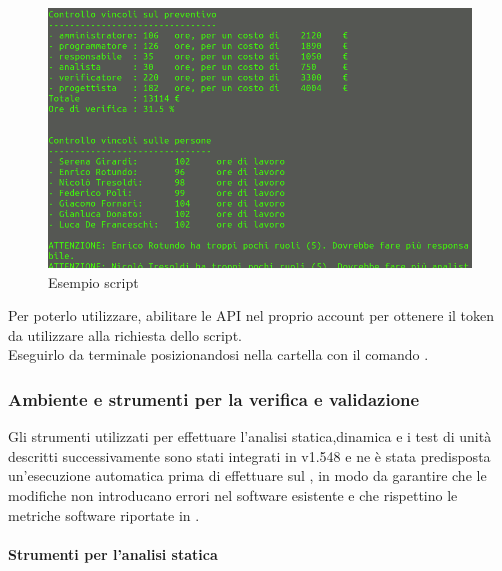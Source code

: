 \begin{figure}[H]
    \centering
    \includegraphics[scale=0.35] {ScriptGantt.png} 
    \caption{Esempio script}
\end{figure}

Per poterlo utilizzare, abilitare le API nel proprio account  per ottenere il token da utilizzare alla richiesta dello script. \\
Eseguirlo da terminale posizionandosi nella cartella  con il comando .

	\subsubsection{Ambiente e strumenti per la verifica e validazione}
	Gli strumenti utilizzati per effettuare l'analisi statica,dinamica e i test di unità descritti successivamente sono stati
	integrati in  v1.548 e ne è stata predisposta un'esecuzione automatica prima di effettuare 
	sul , in modo da garantire che le modifiche non introducano errori nel software esistente e che rispettino
	le metriche software riportate in \PianoDiQualifica{}.

		\paragraph{Strumenti per l'analisi statica}
		

